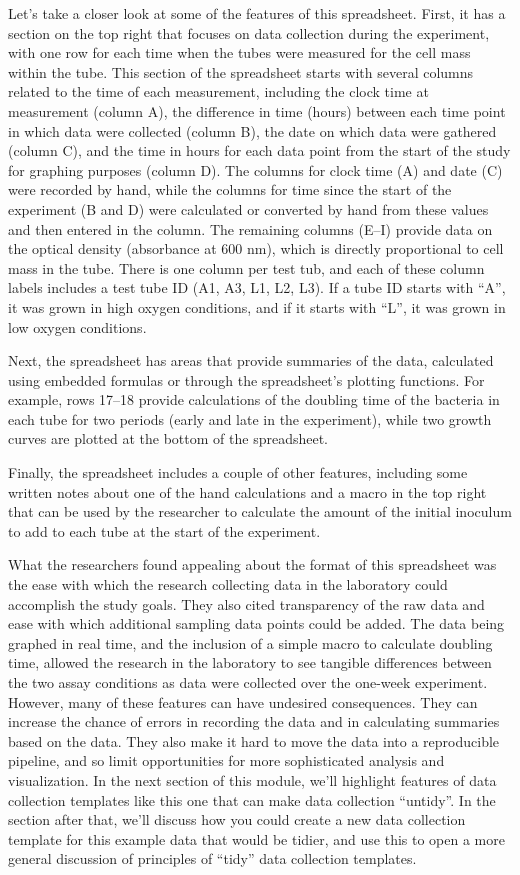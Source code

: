 \documentclass[]{tufte-book}
\begin{document}
Let's take a closer look at some of the features of this spreadsheet. First, it
has a section on the top right that focuses on data collection during the
experiment, with one row for each time when the tubes were measured for the cell
mass within the tube. This section of the spreadsheet starts with several
columns related to the time of each measurement, including the clock time at
measurement (column A), the difference in time (hours) between each time point
in which data were collected (column B), the date on which data were gathered
(column C), and the time in hours for each data point from the start of the
study for graphing purposes (column D). The columns for clock time (A) and date
(C) were recorded by hand, while the columns for time since the start of the
experiment (B and D) were calculated or converted by hand from these values and
then entered in the column. The remaining columns (E--I) provide data on the
optical density (absorbance at 600 nm), which is directly proportional to cell
mass in the tube. There is one column per test tub, and each of these column
labels includes a test tube ID (A1, A3, L1, L2, L3). If a tube ID starts with
``A'', it was grown in high oxygen conditions, and if it starts with ``L'', it was
grown in low oxygen conditions.

Next, the spreadsheet has areas that provide summaries of the data, calculated
using embedded formulas or through the spreadsheet's plotting functions. For
example, rows 17--18 provide calculations of the doubling time of the bacteria
in each tube for two periods (early and late in the experiment), while two
growth curves are plotted at the bottom of the spreadsheet.

Finally, the spreadsheet includes a couple of other features, including some
written notes about one of the hand calculations and a macro in the top right
that can be used by the researcher to calculate the amount of the initial
inoculum to add to each tube at the start of the experiment.

What the researchers found appealing about the format of this spreadsheet was
the ease with which the research collecting data in the laboratory could
accomplish the study goals. They also cited transparency of the raw data and
ease with which additional sampling data points could be added. The data being
graphed in real time, and the inclusion of a simple macro to calculate doubling
time, allowed the research in the laboratory to see tangible differences between
the two assay conditions as data were collected over the one-week experiment.
However, many of these features can have undesired consequences. They can increase
the chance of errors in recording the data and in calculating summaries based on the
data. They also make it hard to move the data into a reproducible pipeline, and
so limit opportunities for more sophisticated analysis and visualization. In the
next section of this module, we'll highlight features of data collection templates
like this one that can make data collection ``untidy''. In the section after that,
we'll discuss how you could create a new data collection template for this example
data that would be tidier, and use this to open a more general discussion of
principles of ``tidy'' data collection templates.
\end{document}
